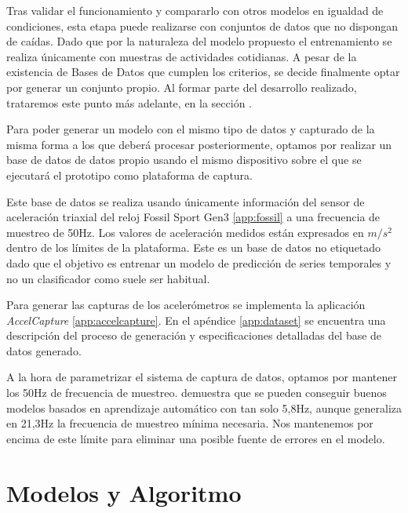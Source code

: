 Tras validar el funcionamiento y compararlo con otros modelos en igualdad de condiciones, esta etapa puede realizarse con conjuntos de datos que no dispongan de caídas. Dado que por la naturaleza del modelo propuesto el entrenamiento se realiza únicamente con muestras de actividades cotidianas. A pesar de la existencia de Bases de Datos que cumplen los criterios, se decide finalmente optar por generar un conjunto propio. Al formar parte del desarrollo realizado, trataremos este punto más adelante, en la sección . 




Para poder generar un modelo con el mismo tipo de datos y capturado de la misma forma a los que deberá procesar posteriormente, optamos por realizar un base de datos de datos propio usando el mismo dispositivo sobre el que se ejecutará el prototipo como plataforma de captura.

Este base de datos se realiza usando únicamente información del sensor de aceleración triaxial del reloj Fossil Sport Gen3 \ref{app:fossil} a una frecuencia de muestreo de 50Hz. Los valores de aceleración medidos están expresados en $m/s^2$ dentro de los límites de la plataforma. Este es un base de datos no etiquetado dado que el objetivo es entrenar un modelo de predicción de series temporales y no un clasificador como suele ser habitual.

Para generar las capturas de los acelerómetros se implementa la aplicación \textit{AccelCapture} \ref{app:accelcapture}. En el apéndice \ref{app:dataset} se encuentra una descripción del proceso de generación y especificaciones detalladas del base de datos generado.

A la hora de parametrizar el sistema de captura de datos, optamos por mantener los 50Hz de frecuencia de muestreo. \cite{Liu2018} demuestra que se pueden conseguir buenos modelos basados en aprendizaje automático con tan solo 5,8Hz, aunque generaliza en 21,3Hz la frecuencia de muestreo mínima necesaria. Nos mantenemos por encima de este límite para eliminar una posible fuente de errores en el modelo.





\section{Modelos y Algoritmo}\label{sec:req:modelos}

